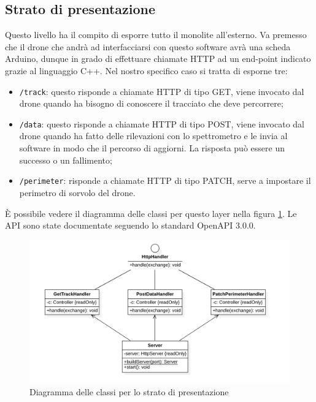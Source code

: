 \subsection{Strato di presentazione}
Questo livello ha il compito di esporre tutto il monolite all'esterno.
Va premesso che il drone che andrà ad interfacciarsi con questo software avrà una scheda Arduino, dunque in grado di effettuare chiamate HTTP ad un end-point indicato grazie al linguaggio C++.
Nel nostro specifico caso si tratta di esporne tre:
\begin{itemize}
    \item \verb|/track|: questo risponde a chiamate HTTP di tipo GET, viene invocato dal drone quando ha bisogno di conoscere il tracciato che deve percorrere;
    \item \verb|/data|: questo risponde a chiamate HTTP di tipo POST, viene invocato dal drone quando ha fatto delle rilevazioni con lo spettrometro e le invia al software in modo che il percorso di aggiorni. La risposta può essere un successo o un fallimento;
    \item \verb|/perimeter|: risponde a chiamate HTTP di tipo PATCH, serve a impostare il perimetro di sorvolo del drone.
\end{itemize}
È possibile vedere il diagramma delle classi per questo layer nella figura \ref{fig:class_diagram_presentation}. Le API sono state documentate seguendo lo standard OpenAPI 3.0.0.

\begin{figure}
    \centering
    \includegraphics[width=\textwidth]{immagini/presentation_classes.png}
    \caption{Diagramma delle classi per lo strato di presentazione}
    \label{fig:class_diagram_presentation}
\end{figure}

